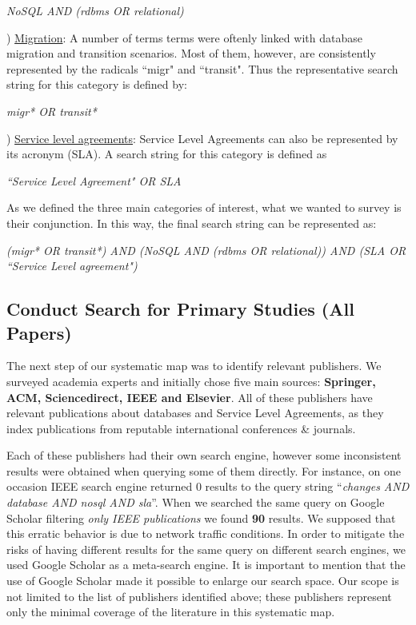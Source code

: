 \documentclass{article}
\begin{document}
\begin{center}
\textit{NoSQL AND (rdbms OR relational)}
\end{center}

) \underline{Migration}: A number of terms terms were oftenly linked with database migration and transition scenarios. Most of them, however, are consistently represented by the radicals ``migr" and ``transit". Thus the representative search string for this category is defined by: 


\begin{center}
\textit{migr* OR transit*}
\end{center}


) \underline{Service level agreements}: Service Level Agreements can also be represented by its acronym (SLA). 
A search string for this category is defined as 
\begin{center}
\textit{``Service Level Agreement" OR SLA}
\end{center}

As we defined the three main categories of interest, what we wanted to survey is their conjunction. 
In this way, the final search string can be represented as: 

\begin{center}
\textit{(migr* OR transit*) AND (NoSQL AND (rdbms OR relational)) AND (SLA OR ``Service Level agreement") 
}\end{center}

\subsection{Conduct Search for Primary Studies (All Papers)}
\label{sec:allPapers}

The next step of our systematic map was to identify relevant publishers. We surveyed academia experts and initially chose five main sources: \textbf{Springer, ACM, Sciencedirect, IEEE and Elsevier}. 
All of these publishers have relevant publications about databases and Service Level Agreements, as they index publications from reputable international conferences \& journals.  

Each of these publishers had their own search engine, however some inconsistent results were obtained when querying some of them directly.
For instance, on one occasion IEEE search engine returned 0 results to the query string ``\textit{changes AND database AND nosql AND sla}''. 
When we searched the same query on Google Scholar filtering \textit{only IEEE publications} we found \textbf{90} results.
We supposed that this erratic behavior is due to network traffic conditions.
In order to mitigate the risks of having different results for the same query on different search engines, we used Google Scholar as a meta-search engine. 
It is important to mention that the use of Google Scholar made it possible to enlarge our search space.
Our scope is not limited to the list of publishers identified above; these publishers represent only the minimal coverage of the literature in this systematic map.
\end{document}
